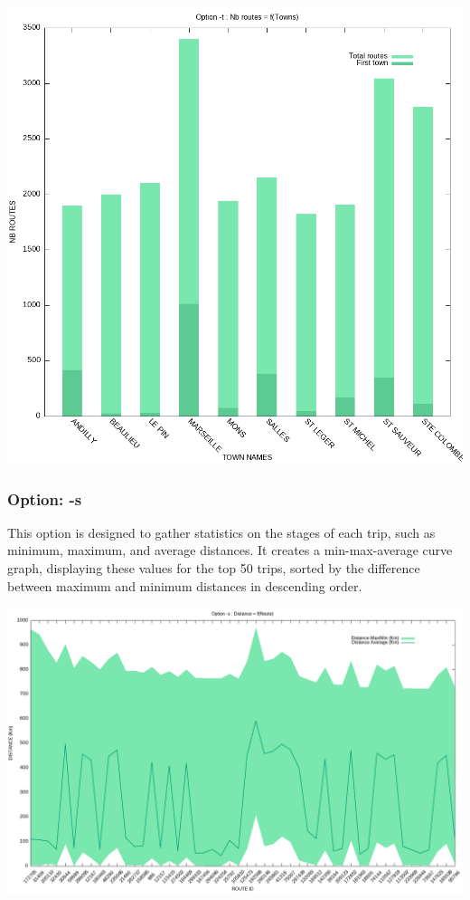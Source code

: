 \documentclass[11pt]{article}
\begin{document}
\vspace*{\fill}
\begin{center}
    \includegraphics[width=\textwidth]{t_graph.png}
\end{center}
\vspace*{\fill}

\newpage
\subsubsection*{Option: \color{blue}-s}
This option is designed to gather statistics on the stages of each trip, such as minimum, maximum, and average distances. It creates a min-max-average curve graph, displaying these values for the top 50 trips, sorted by the difference between maximum and minimum distances in descending order.

\vspace*{\fill}
\begin{center}
    \includegraphics[width=\textwidth]{s_graph.png}
\end{center}
\vspace*{\fill}
\end{document}
